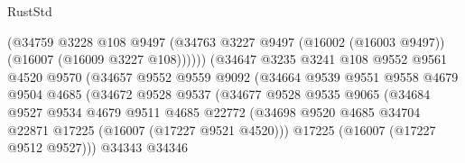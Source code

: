\begin{lexlean}{RustStd}
\begin{coremodule}
                                      (@34759
                                        @3228
                                        @108
                                        @9497
                                        (@34763
                                          @3227
                                          @9497
                                          (@16002 (@16003 @9497))
                                          (@16007 (@16009 @3227 @108))))))
                                  (@34647
                                    @3235
                                    @3241
                                    @108
                                    @9552
                                    @9561
                                    @4520
                                    @9570
                                    (@34657
                                      @9552
                                      @9559
                                      @9092
                                      (@34664
                                        @9539
                                        @9551
                                        @9558
                                        @4679
                                        @9504
                                        @4685
                                        (@34672
                                          @9528
                                          @9537
                                          (@34677
                                            @9528
                                            @9535
                                            @9065
                                            (@34684
                                              @9527
                                              @9534
                                              @4679
                                              @9511
                                              @4685
                                              @22772
                                              (@34698
                                                @9520
                                                @4685
                                                @34704
                                                @22871
                                                @17225
                                                (@16007 (@17227 @9521 @4520)))
                                              @17225
                                              (@16007 (@17227 @9512 @9527)))
                                            @34343
                                            @34346

\end{coremodule}
\end{lexlean}
